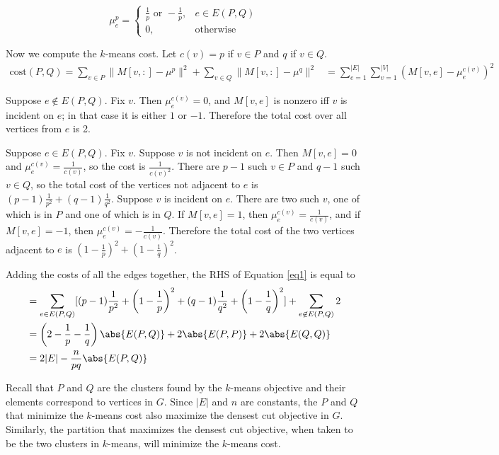 \begin{equation*}
    \mu_e^p=\begin{cases}\frac{1}{p}\text{ or }-\frac{1}{p},&e\in E(P,Q)\\
                         0,&\text{otherwise}
            \end{cases}
\end{equation*}

Now we compute the $k$-means cost. Let $c(v)=p$ if $v\in P$ and $q$ if $v\in Q$.
\begin{align}\label{eq1}
    \text{cost}(P,Q)=\sum_{v\in P}\|M[v,:]-\mu^p\|^2+\sum_{v\in Q}\|M[v,:]-\mu^q\|^2 &= \sum_{e=1}^{|E|}\sum_{v=1}^{|V|}(M[v,e]-\mu_e^{c(v)})^2
\end{align}

Suppose $e\not\in E(P,Q)$. Fix $v$. Then $\mu_e^{c(v)}=0$, and $M[v,e]$ is nonzero iff $v$ is incident on $e$; in that case it is either $1$ or $-1$. Therefore the total cost over all vertices from $e$ is 2.

Suppose $e\in E(P,Q)$. Fix $v$. Suppose $v$ is not incident on $e$. Then $M[v,e]=0$ and $\mu^{c(v)}_e=\frac{1}{c(v)}$, so the cost is $\frac{1}{c(v)^2}$. There are $p-1$ such $v\in P$ and $q-1$ such $v\in Q$, so the total cost of the vertices not adjacent to $e$ is $(p-1)\frac{1}{p^2}+(q-1)\frac{1}{q^2}$. Suppose $v$ is incident on $e$. There are two such $v$, one of which is in $P$ and one of which is in $Q$. If $M[v,e]=1$, then $\mu^{c(v)}_e=\frac{1}{c(v)}$, and if $M[v,e]=-1$, then $\mu^{c(v)}_e=-\frac{1}{c(v)}$. Therefore the total cost of the two vertices adjacent to $e$ is $(1-\frac{1}{p})^2+(1-\frac{1}{q})^2$.

Adding the costs of all the edges together, the RHS of Equation \eqref{eq1} is equal to
\begin{align}
    &= \sum_{e\in E(P,Q)}[(p-1)\frac{1}{p^2}+\left(1-\frac{1}{p}\right)^2+(q-1)\frac{1}{q^2}+\left(1-\frac{1}{q}\right)^2] + \sum_{e\not\in E(P,Q)}2 \\
    &= \left(2-\frac{1}{p}-\frac{1}{q}\right)\abs{E(P,Q)}+2\abs{E(P,P)}+2\abs{E(Q,Q)} \\
    &= 2|E| - \frac{n}{pq}\abs{E(P,Q)}
\end{align}

Recall that $P$ and $Q$ are the clusters found by the $k$-means objective and their elements correspond to vertices in $G$. Since $|E|$ and $n$ are constants, the $P$ and $Q$ that minimize the $k$-means cost also maximize the densest cut objective in $G$. Similarly, the partition that maximizes the densest cut objective, when taken to be the two clusters in $k$-means, will minimize the $k$-means cost.


